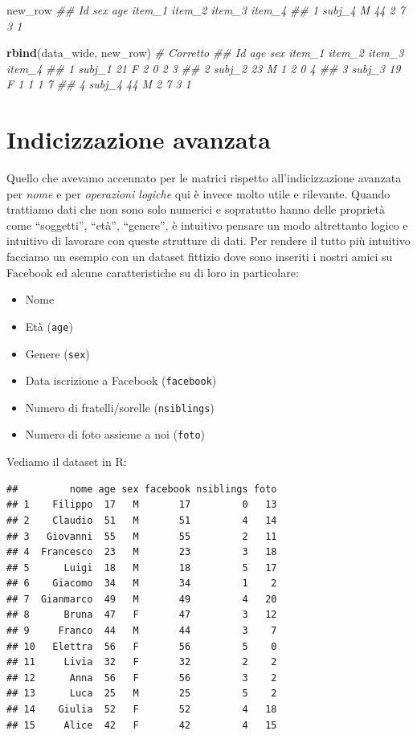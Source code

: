 \documentclass[
]{book}
\newenvironment{Shaded}{\begin{snugshade}}{\end{snugshade}}
\newcommand{\CommentTok}[1]{\textcolor[rgb]{0.56,0.35,0.01}{\textit{#1}}}
\newcommand{\KeywordTok}[1]{\textcolor[rgb]{0.13,0.29,0.53}{\textbf{#1}}}
\newcommand{\NormalTok}[1]{#1}
\providecommand{\tightlist}{%
  \setlength{\itemsep}{0pt}\setlength{\parskip}{0pt}}
\begin{document}
\begin{Shaded}
\begin{Highlighting}[]
\NormalTok{new_row}
\CommentTok{##       Id sex age item_1 item_2 item_3 item_4}
\CommentTok{## 1 subj_4   M  44      2      7      3      1}

\KeywordTok{rbind}\NormalTok{(data_wide, new_row) }\CommentTok{# Corretto}
\CommentTok{##       Id age sex item_1 item_2 item_3 item_4}
\CommentTok{## 1 subj_1  21   F      2      0      2      3}
\CommentTok{## 2 subj_2  23   M      1      2      0      4}
\CommentTok{## 3 subj_3  19   F      1      1      1      7}
\CommentTok{## 4 subj_4  44   M      2      7      3      1}
\end{Highlighting}
\end{Shaded}

\hypertarget{indicizzazione-avanzata-1}{%
\section{Indicizzazione avanzata}\label{indicizzazione-avanzata-1}}

Quello che avevamo accennato per le matrici rispetto all'indicizzazione avanzata per \emph{nome} e per \emph{operazioni logiche} qui è invece molto utile e rilevante. Quando trattiamo dati che non sono solo numerici e sopratutto hanno delle proprietà come ``soggetti'', ``età'', ``genere'', è intuitivo pensare un modo altrettanto logico e intuitivo di lavorare con queste strutture di dati. Per rendere il tutto più intuitivo facciamo un esempio con un dataset fittizio dove sono inseriti i nostri amici su Facebook ed alcune caratteristiche su di loro in particolare:

\begin{itemize}
\tightlist
\item
  Nome
\item
  Età (\texttt{age})
\item
  Genere (\texttt{sex})
\item
  Data iscrizione a Facebook (\texttt{facebook})
\item
  Numero di fratelli/sorelle (\texttt{nsiblings})
\item
  Numero di foto assieme a noi (\texttt{foto})
\end{itemize}

Vediamo il dataset in R:

\begin{verbatim}
##         nome age sex facebook nsiblings foto
## 1    Filippo  17   M       17         0   13
## 2    Claudio  51   M       51         4   14
## 3   Giovanni  55   M       55         2   11
## 4  Francesco  23   M       23         3   18
## 5      Luigi  18   M       18         5   17
## 6    Giacomo  34   M       34         1    2
## 7  Gianmarco  49   M       49         4   20
## 8      Bruna  47   F       47         3   12
## 9     Franco  44   M       44         3    7
## 10   Elettra  56   F       56         5    0
## 11     Livia  32   F       32         2    2
## 12      Anna  56   F       56         3    2
## 13      Luca  25   M       25         5    2
## 14    Giulia  52   F       52         4   18
## 15     Alice  42   F       42         4   15
\end{verbatim}
\end{document}
